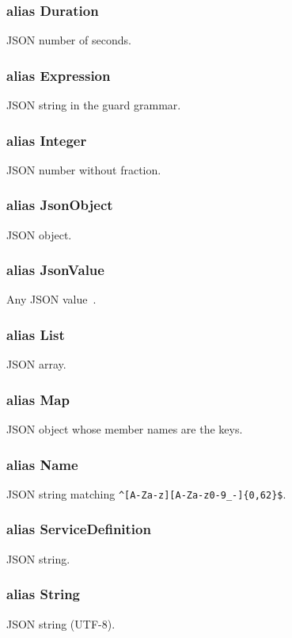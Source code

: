 \documentclass[a4paper]{arrowhead}
\newcommand{\pdef}[1]{{\textcolor{ArrowheadGrey}{#1\label{sec:model:primitives:#1}\label{sec:model:primitives:#1s}}}}
\begin{document}
\subsubsection*{alias \pdef{Duration}}
JSON number of seconds.

\subsubsection*{alias \pdef{Expression}}
JSON string in the guard grammar.

\subsubsection*{alias \pdef{Integer}}
JSON number without fraction.

\subsubsection*{alias \pdef{JsonObject}}
JSON object.

\subsubsection*{alias \pdef{JsonValue}}
Any JSON value~\cite{rfc8259}.

\subsubsection*{alias \pdef{List}}
JSON array.

\subsubsection*{alias \pdef{Map}}
JSON object whose member names are the keys.

\subsubsection*{alias \pdef{Name}}
JSON string matching \texttt{\^{}[A-Za-z][A-Za-z0-9\_-]\{0,62\}\$}.

\subsubsection*{alias \pdef{ServiceDefinition}}
JSON string.

\subsubsection*{alias \pdef{String}}
JSON string (UTF-8).
\end{document}
